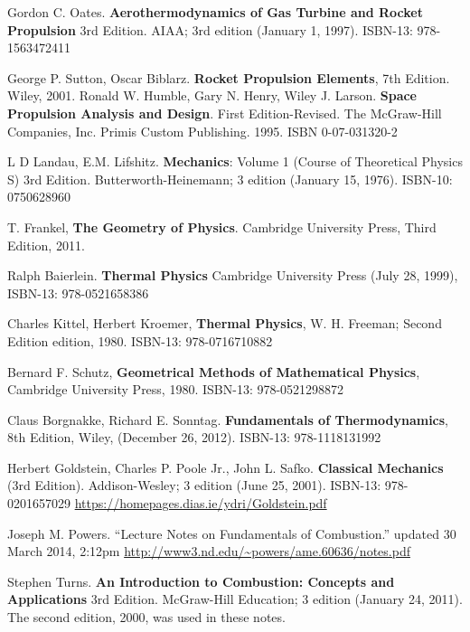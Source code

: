 \documentclass[10pt]{amsart}
\begin{document}
\begin{thebibliography}{9}

Gordon C. Oates. \textbf{Aerothermodynamics of Gas Turbine and Rocket Propulsion} 3rd Edition. AIAA; 3rd edition (January 1, 1997). ISBN-13: 978-1563472411




George P. Sutton, Oscar Biblarz. \textbf{Rocket Propulsion Elements}, 7th Edition. Wiley, 2001.  
Ronald W. Humble, Gary N. Henry, Wiley J. Larson.  \textbf{Space Propulsion Analysis and Design}.  First Edition-Revised.  The McGraw-Hill Companies, Inc.  Primis Custom Publishing.  1995. ISBN 0-07-031320-2   

L D Landau, E.M. Lifshitz. \textbf{Mechanics}: Volume 1 (Course of Theoretical Physics S) 3rd Edition. Butterworth-Heinemann; 3 edition (January 15, 1976). ISBN-10: 0750628960

  
T. Frankel, \textbf{The Geometry of Physics}. Cambridge University Press, Third Edition, 2011.

Ralph Baierlein. \textbf{Thermal Physics} Cambridge University Press (July 28, 1999), ISBN-13: 978-0521658386

Charles Kittel, Herbert Kroemer, \textbf{Thermal Physics}, W. H. Freeman; Second Edition edition, 1980. 
ISBN-13: 978-0716710882

Bernard F. Schutz, \textbf{Geometrical Methods of Mathematical Physics}, Cambridge University Press, 1980.
ISBN-13: 978-0521298872

Claus Borgnakke, Richard E. Sonntag.  \textbf{Fundamentals of Thermodynamics}, 8th Edition, Wiley, (December 26, 2012). 
ISBN-13: 978-1118131992  

Herbert Goldstein, Charles P. Poole Jr., John L. Safko.  \textbf{Classical Mechanics} (3rd Edition). Addison-Wesley; 3 edition (June 25, 2001).  ISBN-13: 978-0201657029 \url{https://homepages.dias.ie/ydri/Goldstein.pdf}

Joseph M. Powers.  ``Lecture Notes on Fundamentals of Combustion.'' updated 30 March 2014, 2:12pm
\url{http://www3.nd.edu/~powers/ame.60636/notes.pdf}


Stephen Turns. \textbf{An Introduction to Combustion: Concepts and Applications} 3rd Edition.  McGraw-Hill Education; 3 edition (January 24, 2011).  The second edition, 2000, was used in these notes.  


\end{thebibliography}
\end{document}
